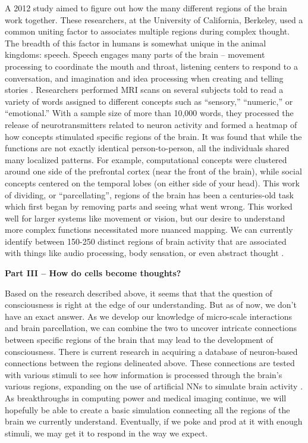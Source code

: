 A 2012 study aimed to figure out how the many different regions of the brain work together. These researchers, at the University of California, Berkeley, used a common uniting factor to associates multiple regions during complex thought. The breadth of this factor in humans is somewhat unique in the animal kingdoms: speech. Speech engages many parts of the brain – movement processing to coordinate the mouth and throat, listening centers to respond to a conversation, and imagination and idea processing when creating and telling stories \cite{huth}. Researchers performed MRI scans on several subjects told to read a variety of words assigned to different concepts such as “sensory,” “numeric,” or “emotional.” With a sample size of more than 10,000 words, they processed the release of neurotransmitters related to neuron activity and formed a heatmap of how concepts stimulated specific regions of the brain. It was found that while the functions are not exactly identical person-to-person, all the individuals shared many localized patterns. For example, computational concepts were clustered around one side of the prefrontal cortex (near the front of the brain), while social concepts centered on the temporal lobes (on either side of your head). This work of dividing, or “parcellating”, regions of the brain has been a centuries-old task which first began by removing parts and seeing what went wrong. This worked well for larger systems like movement or vision, but our desire to understand more complex functions necessitated more nuanced mapping. We can currently identify between 150-250 distinct regions of brain activity that are associated with things like audio processing, body sensation, or even abstract thought \cite{glasser}.

\noindent{}
\textbf{Part III – How do cells become thoughts?}

Based on the research described above, it seems that that the question of consciousness is right at the edge of our understanding. But as of now, we don’t have an exact answer. As we develop our knowledge of micro-scale interactions and brain parcellation, we can combine the two to uncover intricate connections between specific regions of the brain that may lead to the development of consciousness. There is current research in acquiring a database of neuron-based connections between the regions delineated above. These connections are tested with various stimuli to see how information is processed through the brain’s various regions, expanding on the use of artificial NNs to simulate brain activity \cite{swanson}. As breakthroughs in computing power and medical imaging continue, we will hopefully be able to create a basic simulation connecting all the regions of the brain we currently understand. Eventually, if we poke and prod at it with enough stimuli, we may get it to respond in the way we expect. 

